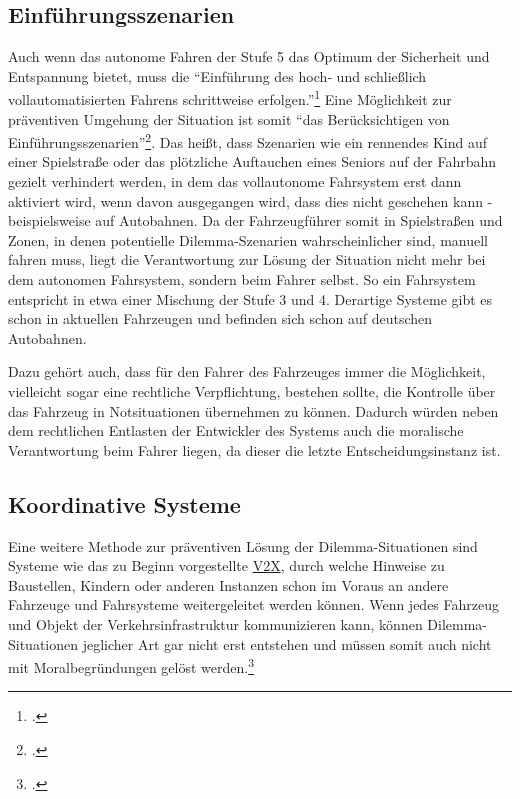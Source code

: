 \documentclass[a4paper, 12pt, openany]{book}
\begin{document}
            \subsection{Einführungsszenarien}
                Auch wenn das autonome Fahren der Stufe 5 das Optimum der Sicherheit und Entspannung bietet, muss die \enquote{Einführung des hoch‐ und schließlich vollautomatisierten Fahrens schrittweise erfolgen.}\footcite[223]{scholz2016autonomes} Eine Möglichkeit zur präventiven Umgehung der Situation ist somit \enquote{das Berücksichtigen von Einführungsszenarien}\footcite[222]{scholz2016autonomes}. Das heißt, dass Szenarien wie ein rennendes Kind auf einer Spielstraße oder das plötzliche Auftauchen eines Seniors auf der Fahrbahn gezielt verhindert werden, in dem das vollautonome Fahrsystem erst dann aktiviert wird, wenn davon ausgegangen wird, dass dies nicht geschehen kann - beispielsweise auf Autobahnen.  Da der Fahrzeugführer somit in Spielstraßen und Zonen, in denen potentielle Dilemma-Szenarien wahrscheinlicher sind, manuell fahren muss, liegt die Verantwortung zur Lösung der Situation nicht mehr bei dem autonomen Fahrsystem, sondern beim Fahrer selbst. So ein Fahrsystem entspricht in etwa einer Mischung der Stufe 3 und 4. Derartige Systeme gibt es schon in aktuellen Fahrzeugen und befinden sich schon auf deutschen Autobahnen.\par
                Dazu gehört auch, dass für den Fahrer des Fahrzeuges immer die Möglichkeit, vielleicht sogar eine rechtliche Verpflichtung, bestehen sollte, die Kontrolle über das Fahrzeug in Notsituationen übernehmen zu können. Dadurch würden neben dem rechtlichen Entlasten der Entwickler des Systems auch die moralische Verantwortung beim Fahrer liegen, da dieser die letzte Entscheidungsinstanz ist.
            
            \subsection{Koordinative Systeme}
                Eine weitere Methode zur präventiven Lösung der Dilemma-Situationen sind Systeme wie das zu Beginn vorgestellte \hyperref[V2V]{V2X}, durch welche Hinweise zu Baustellen, Kindern oder anderen Instanzen schon im Voraus an andere Fahrzeuge und Fahrsysteme weitergeleitet werden können. Wenn jedes Fahrzeug und Objekt der Verkehrsinfrastruktur kommunizieren kann, können Dilemma-Situationen jeglicher Art gar nicht erst entstehen und müssen somit auch nicht mit Moralbegründungen gelöst werden.\footcite[224]{scholz2016autonomes}
            
\end{document}
